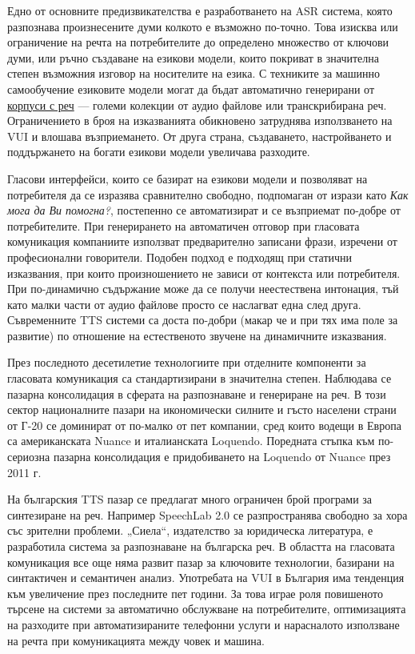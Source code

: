 \documentclass[]{../../metanetpaper}
\begin{document}
\begin{multicols}{2}
Едно от основните предизвикателства е разработването на ASR система, която разпознава произнесените думи колкото е възможно по-точно. Това изисква или
 ограничение на речта на потребителите до определено множество от ключови думи, или ръчно създаване на езикови модели, които покриват
в значителна степен възможния изговор на носителите на езика.
С техниките за машинно самообучение езиковите модели могат да бъдат автоматично генерирани от \uline{корпуси с реч} — големи колекции от аудио файлове или транскрибирана реч.
Ограничението в броя на изказванията обикновено затруднява  използването на VUI  и влошава възприемането. От друга страна, създаването, настройването и поддържането на богати  езикови модели увеличава разходите.
 
Гласови интерфейси, които се базират на езикови модели и позволяват на потребителя да се изразява сравнително свободно, подпомаган от изрази като \textit{Как мога да Ви помогна?}, постепенно се автоматизират и се възприемат по-добре от потребителите.
При генерирането на автоматичен отговор при гласовата комуникация компаниите използват предварително записани фрази, изречени от професионални говорители. Подобен подход е подходящ при статични изказвания, при които произношението не зависи от контекста или потребителя. При по-динамично съдържание може да се получи неестествена интонация, тъй като  малки части от аудио файлове просто се наслагват една след друга. Съвременните TTS системи са доста по-добри (макар че и при тях  има поле за развитие) по отношение на естественото звучене 
 на динамичните изказвания.

През последното десетилетие технологиите при отделните компоненти за гласовата комуникация са стандартизирани в значителна степен. Наблюдава се пазарна консолидация в сферата на разпознаване и генериране на реч. В този сектор националните пазари на икономически силните и гъсто населени страни от Г-20 се доминират от по-малко от пет компании, сред които водещи в Европа са американската Nuance и италианската Loquendo. Поредната стъпка към по-сериозна пазарна консолидация  е придобиването на Loquendo от Nuance през 2011 г.

На българския TTS пазар се предлагат много ограничен брой програми за синтезиране на реч. Например SpeechLab 2.0 се разпространява свободно за хора със зрителни проблеми. „Сиела“, издателство за юридическа литература, е разработила система за разпознаване на българска реч. В областта на  гласовата комуникация все още няма развит пазар за ключовите технологии, базирани на синтактичен и семантичен анализ.
Употребата на VUI в България има тенденция към увеличение през последните пет години. За това играе роля повишеното търсене на системи за автоматично
 обслужване на потребителите, оптимизацията на
 разходите при автоматизираните телефонни услуги и
 нарасналото използване на речта при комуникацията между човек и
машина.


\end{multicols}
\end{document}
